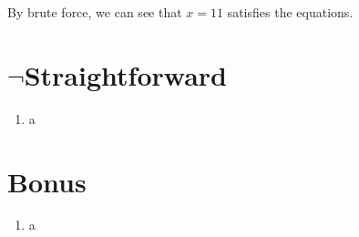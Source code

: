 \documentclass[a4paper]{article}
\begin{document}
\begin{enumerate}
\begin{enumerate}
            By brute force, we can see that $x = 11$ satisfies the equations.



                

        \end{enumerate}

    \end{enumerate}

\newpage
\section{$\neg$Straightforward}
    \begin{enumerate}
        \item a

    \end{enumerate}

\newpage
\section{Bonus}
    \begin{enumerate}
        \item a
    \end{enumerate}
\end{document}
